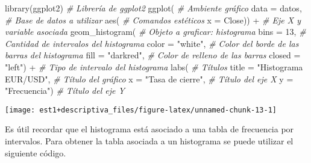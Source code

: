 \documentclass[
]{book}
\newenvironment{Shaded}{\begin{snugshade}}{\end{snugshade}}
\newcommand{\AttributeTok}[1]{\textcolor[rgb]{0.77,0.63,0.00}{#1}}
\newcommand{\CommentTok}[1]{\textcolor[rgb]{0.56,0.35,0.01}{\textit{#1}}}
\newcommand{\DecValTok}[1]{\textcolor[rgb]{0.00,0.00,0.81}{#1}}
\newcommand{\FunctionTok}[1]{\textcolor[rgb]{0.00,0.00,0.00}{#1}}
\newcommand{\NormalTok}[1]{#1}
\newcommand{\OtherTok}[1]{\textcolor[rgb]{0.56,0.35,0.01}{#1}}
\newcommand{\SpecialCharTok}[1]{\textcolor[rgb]{0.00,0.00,0.00}{#1}}
\newcommand{\StringTok}[1]{\textcolor[rgb]{0.31,0.60,0.02}{#1}}
\begin{document}
\begin{Shaded}
\begin{Highlighting}[]
\FunctionTok{library}\NormalTok{(ggplot2) }\CommentTok{\# Librería de ggplot2}
\FunctionTok{ggplot}\NormalTok{( }\CommentTok{\# Ambiente gráfico}
  \AttributeTok{data =}\NormalTok{ datos, }\CommentTok{\# Base de datos a utilizar}
       \FunctionTok{aes}\NormalTok{( }\CommentTok{\# Comandos estéticos}
         \AttributeTok{x =}\NormalTok{ Close)) }\SpecialCharTok{+} \CommentTok{\# Eje X y variable asociada }
  \FunctionTok{geom\_histogram}\NormalTok{( }\CommentTok{\# Objeto a graficar: histograma}
    \AttributeTok{bins =} \DecValTok{13}\NormalTok{, }\CommentTok{\# Cantidad de intervalos del histograma}
    \AttributeTok{color =} \StringTok{"white"}\NormalTok{, }\CommentTok{\# Color del borde de las barras del histograma}
    \AttributeTok{fill =} \StringTok{"darkred"}\NormalTok{, }\CommentTok{\# Color de relleno de las barras}
    \AttributeTok{closed =} \StringTok{"left"}\NormalTok{) }\SpecialCharTok{+} \CommentTok{\# Tipo de intervalo del histograma}
  \FunctionTok{labs}\NormalTok{( }\CommentTok{\# Títulos}
    \AttributeTok{title =} \StringTok{"Histograma EUR/USD"}\NormalTok{, }\CommentTok{\# Título del gráfico}
    \AttributeTok{x =} \StringTok{"Tasa de cierre"}\NormalTok{, }\CommentTok{\# Título del eje X}
    \AttributeTok{y =} \StringTok{"Frecuencia"}\NormalTok{) }\CommentTok{\# Título del eje Y}
\end{Highlighting}
\end{Shaded}

\begin{center}\texttt{[image: est1+descriptiva\_files/figure-latex/unnamed-chunk-13-1]} \end{center}

Es útil recordar que el histograma está asociado a una tabla de frecuencia por intervalos. Para obtener la tabla asociada a un histograma se puede utilizar el siguiente código.

\begin{Shaded}
\end{Shaded}
\end{document}
